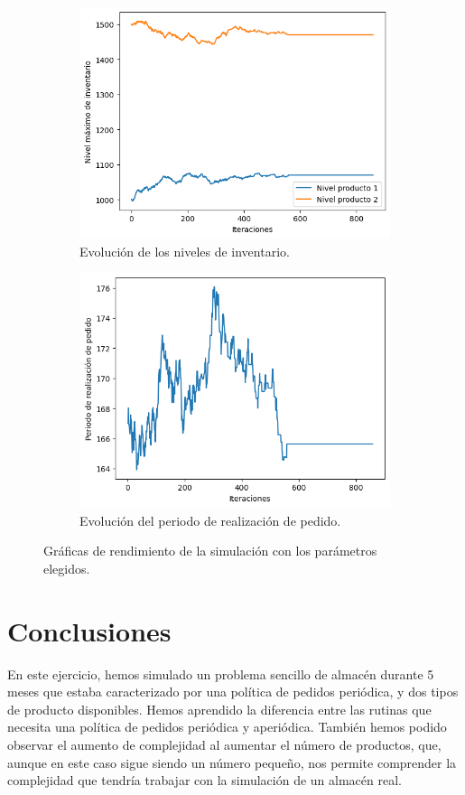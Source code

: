 \documentclass[a4paper,12pt]{article}
\begin{document}
\begin{figure}[H]
\begin{subfigure}{.45\textwidth}
			\includegraphics[width=\textwidth]{include/ultima_ejec/niv_inv.png}
			\caption{Evolución de los niveles de inventario. }
		\end{subfigure}
		\hfill
		\begin{subfigure}{.45\textwidth}
			\centering
			\includegraphics[width=\textwidth]{include/ultima_ejec/periodo.png}
			\caption{Evolución del periodo de realización de pedido. }
		\end{subfigure}
		\caption{Gráficas de rendimiento de la simulación con los parámetros elegidos.}
		\label{result-graphs}
	\end{figure}
	
	\section{Conclusiones}
	En este ejercicio, hemos simulado un problema sencillo de almacén durante 5 meses que estaba caracterizado por una política de pedidos periódica, y dos tipos de producto disponibles. Hemos aprendido la diferencia entre las rutinas que necesita una política de pedidos periódica y aperiódica. También hemos podido observar el aumento de complejidad al aumentar el número de productos,
	que, aunque en este caso sigue siendo un número pequeño, nos permite comprender la complejidad que tendría trabajar con la simulación de un almacén real. \\
	
\end{document}
